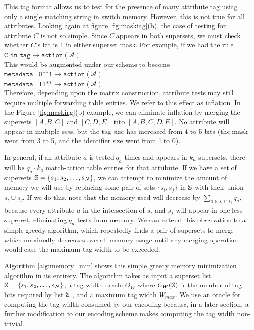 This tag format allows us to test for the presence of many attribute tag using only a single matching string in switch memory.
However, this is not true for all attributes. Looking again at figure \ref{fig:masking}(b), the case of testing for attribute $C$ is not so simple. Since $C$ appears in both supersets, we must check whether $C$'s bit is 1 in either superset mask. For example, if we had the rule\\
\noindent
{%
$\texttt{C in tag} \rightarrow \texttt{action}(\mathcal{A})$\\
}
This would be augmented under our scheme to become\\
\noindent
{%
$\texttt{metadata=0**1} \rightarrow \texttt{action}(\mathcal{A})$\\
$\texttt{metadata=11**} \rightarrow \texttt{action}(\mathcal{A})$\\
}
Therefore, depending upon the matrix construction, attribute tests may still require multiple forwarding table entries. We refer to this effect as inflation. In the Figure \ref{fig:masking}(b) example, we can eliminate inflation by merging the supersets $[A,B,C]$ and $[C,D,E]$ into $[A,B,C,D,E]$. No attribute will appear in multiple sets, but the tag size has increased from 4 to 5 bits (the mask went from 3 to 5, and the identifier size went from 1 to 0).

In general, if an attribute $a$ is tested $q_a$ times and appears in $k_a$ supersets, there will be $q_a\cdot k_a$ match-action table entries for that attribute. If we have a set of supersets $\mathbb{S} = \{s_1, s_2, \dots, s_N\}$, we can attempt to minimize the amount of memory we will use by replacing some pair of sets $\{s_i, s_j\}$ in $\mathbb{S}$ with their union $s_i\cup s_j$. If we do this, note that the memory used will decrease by $\sum_{a \in s_i\cap s_j}q_a$, because every attribute $a$ in the intersection of $s_i$ and $s_j$ will appear in one less superset, eliminating $q_a$ tests from memory. We can extend this observation to a simple greedy algorithm, which repeatedly finds a pair of supersets to merge which maximally decreases overall memory usage until any merging operation would case the maximum tag width to be exceeded. 


Algorithm \ref{alg:memory_min} shows this simple greedy memory minimization algorithm in its entirety. The algorithm takes as input a superset list $\mathbb{S} = \{s_1, s_2, \dots, s_N\}$, a tag width oracle $O_W$ where $O_W(\mathbb{S})$ is the number of tag bits required by list $\mathbb{S}$ , and a maximum tag width $W_{max}$. We use an oracle for computing the tag width consumed by our encoding because, in a later section, a further modification to our encoding scheme makes computing the tag width non-trivial. 

